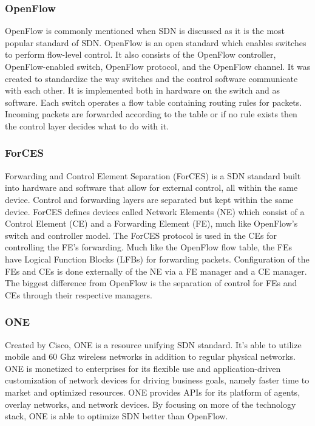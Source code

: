 \documentclass[fullapage,12pt]{article}
\begin{document}
\subsubsection{OpenFlow}

OpenFlow \cite{openflow} is commonly mentioned when SDN is discussed as it is the most popular standard of SDN. OpenFlow is an open standard which enables switches to perform flow-level control. It also consists of the OpenFlow controller, OpenFlow-enabled switch, OpenFlow protocol, and the OpenFlow channel. It was created to standardize the way switches and the control software communicate with each other. It is implemented  both in hardware on the switch and as software. Each switch operates a flow table containing routing rules for packets. Incoming packets are forwarded according to the table or if no rule exists then the control layer decides what to do with it.

\subsubsection{ForCES}

Forwarding and Control Element Separation (ForCES) \cite{forces} is a SDN standard built into hardware and software that allow for external control, all within the same device. Control and forwarding layers are separated but kept within the same device. ForCES defines devices called Network Elements (NE) which consist of a Control Element (CE) and a Forwarding Element (FE), much like OpenFlow's switch and controller model. The ForCES protocol is used in the CEs for controlling the FE's forwarding. Much like the OpenFlow flow table, the FEs have Logical Function Blocks (LFBs) for forwarding packets. Configuration of the FEs and CEs is done externally of the NE via a FE manager and a CE manager. The biggest difference from OpenFlow is the separation of control for FEs and CEs through their respective managers.


\subsubsection{ONE}

Created by Cisco, ONE \cite{ciscoone} is a resource unifying SDN standard. It's able to utilize mobile and 60 Ghz wireless networks in addition to regular physical networks. ONE is monetized to enterprises for its flexible use and application-driven customization of network devices for driving business goals, namely faster time to market and optimized resources. ONE provides APIs for its platform of agents, overlay networks, and network devices. By focusing on more of the technology stack, ONE is able to optimize SDN better than OpenFlow.
\end{document}

